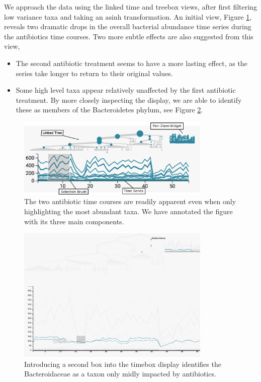 \documentclass[12pt]{article}
\begin{document}
We approach the data using the linked time and treebox views, after
first filtering low variance taxa and taking an \(\text{asinh}\)
transformation. An initial view, Figure \ref{fig:antibioticoverview},
reveals two dramatic drops in the overall bacterial abundance time
series during the antibiotics time courses. Two more subtle effects are
also suggested from this view,

\begin{itemize}
\item
  The second antibiotic treatment seems to have a more lasting effect,
  as the series take longer to return to their original values.
\item
  Some high level taxa appear relatively unaffected by the first
  antibiotic treatment. By more closely inspecting the display, we are
  able to identify these as members of the Bacteroidetes phylum, see
  Figure \ref{fig:antibioticbacteroidetes}.
\end{itemize}

\begin{figure}

{\centering \includegraphics[width=350px]{figure/annotated_antibiotic_overview} 

}

\caption{The two antibiotic time courses are readily apparent even when only highlighting the most abundant taxa. We have annotated the figure with its three main components.}\label{fig:antibioticoverview}
\end{figure}

\begin{figure}

{\centering \includegraphics[width=350px]{figure/antibiotic_bacteroidetes} 

}

\caption{Introducing a second box into the timebox display identifies the Bacteroidaceae as a taxon only midly impacted by antibiotics.}\label{fig:antibioticbacteroidetes}
\end{figure}
\end{document}
